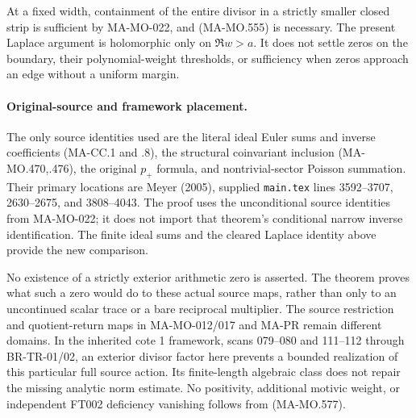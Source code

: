 At a fixed width, containment of the entire divisor in
a strictly smaller closed strip is sufficient by
MA-MO-022, and (MA-MO.555) is necessary.
The present Laplace argument is holomorphic only on
\(\Re w>a\). It does not settle zeros on the boundary,
their polynomial-weight thresholds, or sufficiency when
zeros approach an edge without a uniform margin.

\paragraph{Original-source and framework placement.}
The only source identities used are the literal ideal
Euler sums and inverse coefficients (MA-CC.1 and .8),
the structural coinvariant inclusion (MA-MO.470,.476),
the original \(p_+\) formula, and nontrivial-sector
Poisson summation. Their primary locations are Meyer
(2005), supplied \texttt{main.tex} lines 3592--3707,
2630--2675, and 3808--4043. The proof uses the
unconditional source identities from MA-MO-022; it does
not import that theorem's conditional narrow inverse
identification. The finite ideal sums and the cleared
Laplace identity above provide the new comparison.

No existence of a strictly exterior arithmetic zero is
asserted. The theorem proves what such a zero would do
to these actual source maps, rather than only to an
uncontinued scalar trace or a bare reciprocal multiplier.
The source restriction and quotient-return maps in
MA-MO-012/017 and MA-PR remain different domains.
In the inherited cote 1 framework, scans 079--080 and
111--112 through BR-TR-01/02, an exterior divisor factor
here prevents a bounded realization of this particular
full source action. Its finite-length algebraic class
does not repair the missing analytic norm estimate.
No positivity, additional motivic weight, or independent
FT002 deficiency vanishing follows from (MA-MO.577).
